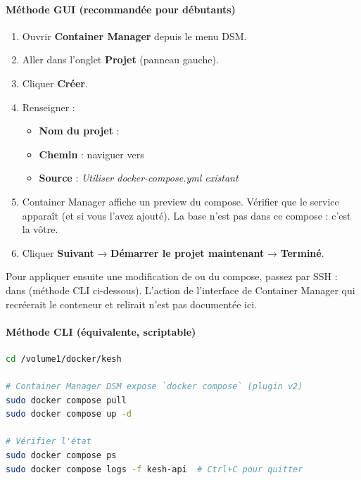\documentclass[a4paper,11pt,oneside]{article}
\begin{document}
\paragraph{Méthode GUI (recommandée pour débutants)}

\begin{enumerate}
    \item Ouvrir \textbf{Container Manager} depuis le menu DSM.
    \item Aller dans l'onglet \textbf{Projet} (panneau gauche).
    \item Cliquer \textbf{Créer}.
    \item Renseigner :
        \begin{itemize}
            \item \textbf{Nom du projet} : 
            \item \textbf{Chemin} : naviguer vers 
            \item \textbf{Source} : \emph{Utiliser docker-compose.yml existant}
        \end{itemize}
    \item Container Manager affiche un preview du compose. Vérifier que le service  apparaît (et  si vous l'avez ajouté). La base n'est pas dans ce compose : c'est la vôtre.
    \item Cliquer \textbf{Suivant} → \textbf{Démarrer le projet maintenant} → \textbf{Terminé}.
\end{enumerate}

\begin{keshnote}
Pour appliquer ensuite une modification de  ou du compose, passez par SSH :  dans  (méthode CLI ci-dessous). L'action de l'interface de Container Manager qui recréerait le conteneur et relirait  n'est pas documentée ici.
\end{keshnote}

\paragraph{Méthode CLI (équivalente, scriptable)}

\begin{lstlisting}[language=bash]
cd /volume1/docker/kesh

# Container Manager DSM expose `docker compose` (plugin v2)
sudo docker compose pull
sudo docker compose up -d

# Vérifier l'état
sudo docker compose ps
sudo docker compose logs -f kesh-api  # Ctrl+C pour quitter
\end{lstlisting}
\end{document}
